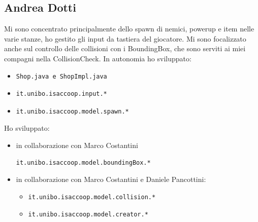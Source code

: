 \documentclass[a4paper,12pt]{report}
\begin{document}
\subsection*{Andrea Dotti}
Mi sono concentrato principalmente dello spawn di nemici, powerup e item nelle varie stanze, ho gestito gli input
da tastiera del giocatore. Mi sono focalizzato anche sul controllo delle collisioni con i BoundingBox, che sono serviti
ai miei compagni nella CollisionCheck.
In autonomia ho sviluppato:
\begin{itemize}
    \item \begin{verbatim}Shop.java e ShopImpl.java \end{verbatim}
    \item \begin{verbatim}it.unibo.isaccoop.input.* \end{verbatim}
    \item \begin{verbatim}it.unibo.isaccoop.model.spawn.* \end{verbatim}
\end{itemize}
Ho sviluppato: 
\begin{itemize}
    \item in collaborazione con Marco Costantini \begin{verbatim}it.unibo.isaccoop.model.boundingBox.* \end{verbatim}
    \item in collaborazione con Marco Costantini e Daniele Pancottini:
    \begin{itemize}
        \item \begin{verbatim}it.unibo.isaccoop.model.collision.* \end{verbatim}
        \item \begin{verbatim}it.unibo.isaccoop.model.creator.* \end{verbatim}
    \end{itemize}
\end{itemize}
\end{document}
